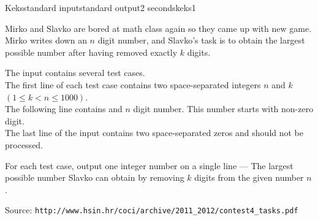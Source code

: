 \begin{problem}{Keks}{standard input}{standard output}{2 seconds}{keks1}

Mirko and Slavko are bored at math class again so they came up with new game. Mirko writes down an $n$ digit number, and Slavko’s task is to obtain the largest possible number after having removed exactly $k$ digits.

\InputFile

The input contains several test cases.\\
The first line of each test case contains two space-separated integers $n$ and $k$ $(1 \leq k < n \leq 1000)$.\\
The following line contains and $n$ digit number. This number starts with non-zero digit.\\
The last line of the input contains two space-separated zeros and should not be processed.

\OutputFile

For each test case, output one integer number on a single line --- The largest possible number Slavko can obtain by removing $k$ digits from the given number $n$.

\Example

\begin{example}
%
\end{example}

Source: \verb|http://www.hsin.hr/coci/archive/2011_2012/contest4_tasks.pdf|

\end{problem}
